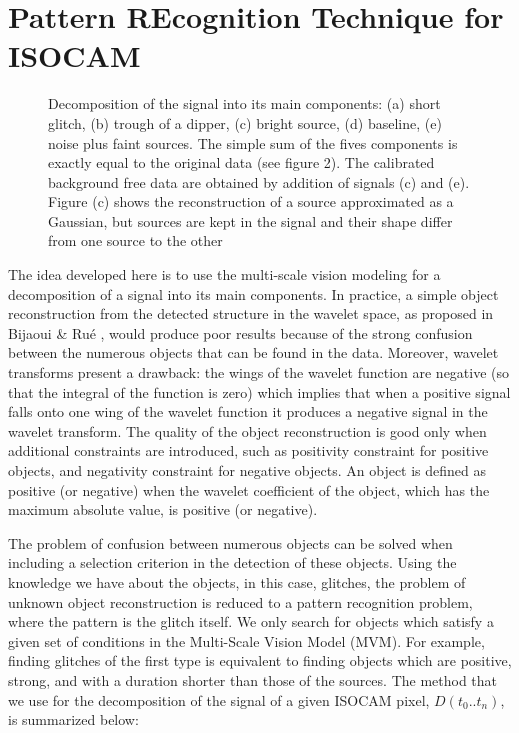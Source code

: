 \section{Pattern REcognition Technique for ISOCAM}
\begin{figure}[htb]
\centerline{
\vbox{
}}
\caption{Decomposition of the signal into its main components: 
(a) short glitch, (b) trough of a dipper, (c) bright source, (d)
baseline, (e) noise plus faint sources. The simple sum of the fives
components is exactly equal to the original data (see figure 2). The
calibrated background free data are obtained by addition of signals
(c) and (e). Figure (c) shows the reconstruction of a source
approximated as a Gaussian, but sources are kept in the signal and
their shape differ from one source to the other}
\label{fig_decomp}
\end{figure}


The idea developed here is to use the multi-scale vision modeling for
a decomposition of a signal into its main components. In practice, a
simple object reconstruction from the detected structure in the
wavelet space, as proposed in Bijaoui \& Ru\'e \cite*{ima:bijaoui95},
would produce poor results because of the strong confusion between the
numerous objects that can be found in the data. Moreover, wavelet
transforms present a drawback: the wings of the wavelet function are
negative (so that the integral of the function is zero) which implies that
when a positive signal falls onto one wing of the wavelet function it
produces a negative signal in the wavelet transform.  The quality of
the object reconstruction is good only when additional constraints are
introduced, such as positivity constraint for positive objects, and negativity
constraint for negative objects. An object is defined as positive
(or negative) when the wavelet coefficient of the object,
which has the maximum absolute value, is positive (or negative).

The problem of confusion between numerous objects can be solved when
including a selection criterion in the detection of these
objects. Using the knowledge we have about the objects, in this case, glitches,
the problem of unknown object reconstruction is reduced to a pattern
recognition problem, where the pattern is the glitch itself. We only
search for objects which satisfy a given set of conditions in the
Multi-Scale Vision Model (MVM). For example, finding glitches of the
first type is equivalent to finding objects which are positive, strong,
and with a duration shorter than those of the sources. The method that
we use for the decomposition of the signal of a given ISOCAM pixel,
$D(t_0..t_n)$, is summarized below:
 
